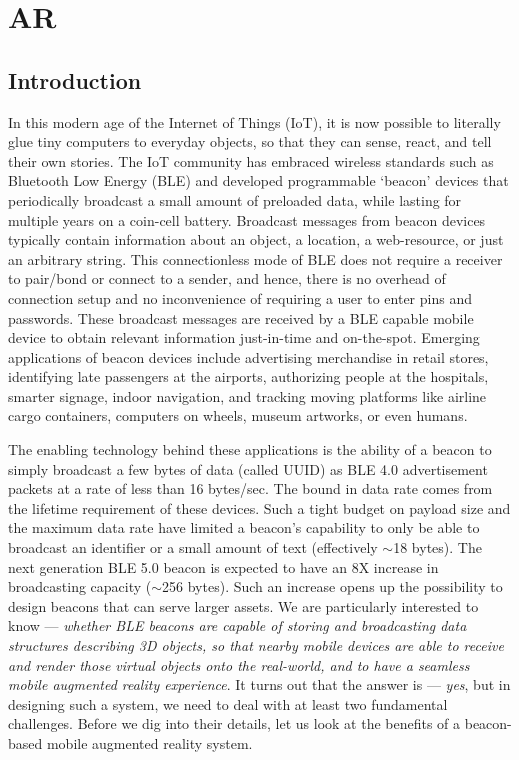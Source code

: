 \chapter{AR}
\section{Introduction}
\label{sec:intro}

In this modern age of the Internet of Things (IoT), it is now possible to literally glue tiny computers to everyday objects, so that they can sense, react, and tell their own stories. The IoT community has embraced wireless standards such as Bluetooth Low Energy (BLE) and developed programmable `beacon' devices that periodically broadcast a small amount of preloaded data, while lasting for multiple years on a coin-cell battery. Broadcast messages from beacon devices typically contain information about an object, a location, a web-resource, or just an arbitrary string. This connectionless mode of BLE does not require a receiver to pair/bond or connect to a sender, and hence, there is no overhead of connection setup and no inconvenience of requiring a user to enter pins and passwords. These broadcast messages are received by a BLE capable mobile device to obtain relevant information just-in-time and on-the-spot.  Emerging applications of beacon devices include advertising merchandise in retail stores, identifying late passengers at the airports, authorizing people at the hospitals, smarter signage, indoor navigation, and tracking moving platforms like airline cargo containers, computers on wheels, museum artworks, or even humans.


The enabling technology behind these applications is the ability of a beacon to simply broadcast a few bytes of data (called UUID) as BLE 4.0 advertisement packets at a rate of less than 16 bytes/sec. The bound in data rate comes from the lifetime requirement of these devices. Such a tight budget on payload size and the maximum data rate have limited a beacon's capability to only be able to broadcast an identifier or a small amount of text (effectively $\sim$18 bytes). The next generation BLE 5.0 beacon is expected to have an 8X increase in broadcasting capacity ($\sim$256 bytes). Such an increase opens up the possibility to design beacons that can serve larger assets. We are particularly interested to know --- \emph{whether BLE beacons are capable of storing and broadcasting data structures describing 3D objects, so that nearby mobile devices are able to receive and render those virtual objects onto the real-world, and to have a seamless mobile augmented reality experience}. It turns out that the answer is --- \emph{yes}, but in designing such a system, we need to deal with at least two fundamental challenges. Before we dig into their details, let us look at the benefits of a beacon-based mobile augmented reality system.

